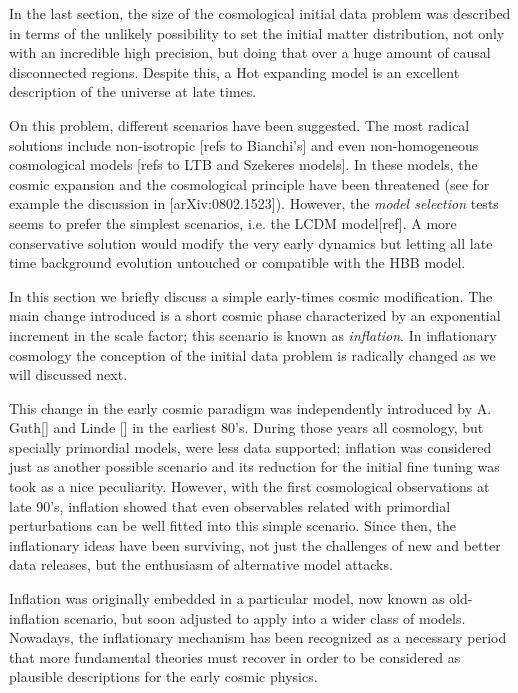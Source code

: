 \documentclass[12pt,letterpaper,twoside]{book}
\newcommand\etcomment[1]{\MakeUppercase{\mytexttt{\textcolor{blue}{#1}}}}
\begin{document}
\etcomment{HBB is not wrong, but incomplete.}In the last section, the size of
the cosmological initial data problem was described in terms of the unlikely
possibility to set the initial matter distribution, not only with an incredible
high precision, but doing that over a huge amount of causal disconnected
regions.  Despite this, a Hot expanding model is an excellent description of the
universe at late times.

\etcomment{How to modify the HBB.}On this problem, different scenarios have been
suggested. The most radical solutions include non-isotropic [refs to Bianchi's]
and even non-homogeneous cosmological models [refs to LTB and Szekeres models].
In these models, the cosmic expansion and the cosmological principle have been
threatened (see for example the discussion in [arXiv:0802.1523]). However, the
\textit{model selection} tests seems to prefer the simplest scenarios,
i.e. the LCDM model[ref]. A more conservative solution would modify the very
early dynamics  but letting all late time background evolution untouched or
compatible with the HBB model.

\etcomment{Broad description of inflation.}In this section we briefly discuss a
simple early-times cosmic modification.  The main change introduced is a short
cosmic phase characterized by an exponential increment in the scale factor; this
scenario is known as \textit{inflation}. In inflationary cosmology the
conception of the initial data problem is radically changed as we will discussed
next.

\etcomment{Origins and survival.}This change in the early cosmic paradigm was
independently introduced  by A.  Guth[] and Linde [] in the earliest 80's.
During those years all cosmology, but specially primordial models, were less data
supported; inflation was considered just as another possible scenario and its
reduction for the initial fine tuning was took as a nice peculiarity. However,
with the first cosmological observations at late 90's, inflation showed that
even observables related with primordial perturbations can be well fitted into
this simple scenario.  Since then, the inflationary ideas have been surviving,
not just the challenges of new and better data releases, but the enthusiasm of
alternative model attacks.

\etcomment{The old vs new inflation, its state in light of last
    observations.}Inflation was originally embedded in a particular model, now
known as old-inflation scenario, but soon adjusted to apply into a wider
class of models. Nowadays, the inflationary mechanism has been recognized as a
necessary period that more fundamental theories must recover in order to be
considered as plausible descriptions for the early cosmic physics.
\end{document}
